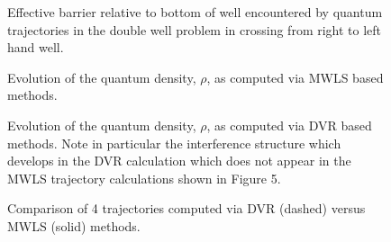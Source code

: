 \begin{figure}
\caption{Effective barrier relative to bottom of well encountered by 
quantum trajectories in the double well problem in crossing from right 
to left hand well.}
\end{figure}


\begin{figure}
\caption{Evolution of the quantum density, $\rho$, as computed via MWLS based methods.}
\end{figure}


\begin{figure}
\caption{ Evolution of the quantum density, $\rho$, as computed via DVR 
based methods.  Note in particular the interference structure which 
develops in the DVR calculation which does not appear in the MWLS 
trajectory calculations shown in Figure 5.}

\end{figure}

\begin{figure}
\caption{Comparison of 4 trajectories computed via DVR (dashed) versus MWLS (solid) methods.}
\end{figure}



